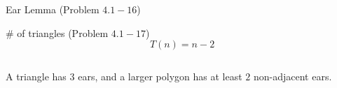 
\begin{frame}{}
  \centerline{}

\end{frame}

\begin{frame}{}
  \begin{exampleblock}{Ear Lemma (Problem $4.1-16$)}
  \end{exampleblock}{}
\end{frame}

\begin{frame}{}
\end{frame}

\begin{frame}{}
  \begin{exampleblock}{\# of triangles (Problem $4.1-17$)}
    \[
      T(n) = n - 2
    \]
  \end{exampleblock}{}

  \begin{columns}
    \pause
    \pause
  \end{columns}
\end{frame}

\begin{frame}{}
  \begin{lemma}
    A triangle has $3$ ears, and a larger  polygon has at least $2$ non-adjacent ears.
  \end{lemma}

  \pause
  \vspace{0.80cm}
  \centerline{}
\end{frame}

